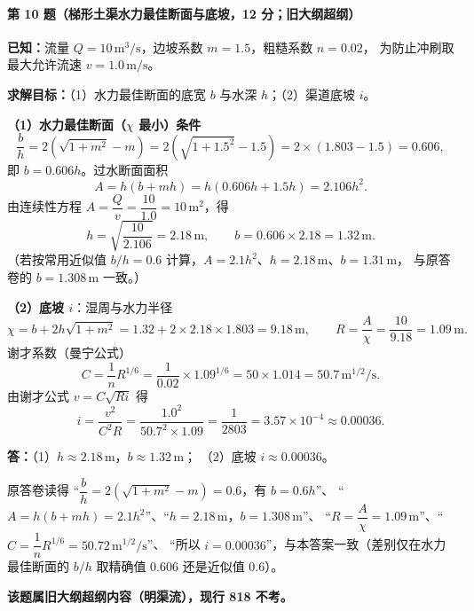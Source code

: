 \paragraph{第 10 题（梯形土渠水力最佳断面与底坡，12 分；旧大纲超纲）}
\begin{jie}
\textbf{已知：}流量 $Q=10\,\mathrm{m^{3}/s}$，边坡系数 $m=1.5$，粗糙系数 $n=0.02$，
为防止冲刷取最大允许流速 $v=1.0\,\mathrm{m/s}$。

\textbf{求解目标：}（1）水力最佳断面的底宽 $b$ 与水深 $h$；（2）渠道底坡 $i$。

\textbf{（1）水力最佳断面（$\chi$ 最小）条件}
\[
\frac{b}{h}=2\left(\sqrt{1+m^{2}}-m\right)
=2\left(\sqrt{1+1.5^{2}}-1.5\right)
=2\times(1.803-1.5)=0.606 ,
\]
即 $b=0.606h$。过水断面面积
\[
A=h(b+mh)=h(0.606h+1.5h)=2.106h^{2}.
\]
由连续性方程 $A=\dfrac{Q}{v}=\dfrac{10}{1.0}=10\,\mathrm{m^{2}}$，得
\[
h=\sqrt{\frac{10}{2.106}}=2.18\,\mathrm{m},
\qquad
b=0.606\times2.18=1.32\,\mathrm{m}.
\]
（若按常用近似值 $b/h=0.6$ 计算，$A=2.1h^{2}$、$h=2.18\,\mathrm{m}$、$b=1.31\,\mathrm{m}$，
与原答卷的 $b=1.308\,\mathrm{m}$ 一致。）

\textbf{（2）底坡 $i$}：湿周与水力半径
\[
\chi=b+2h\sqrt{1+m^{2}}=1.32+2\times2.18\times1.803=9.18\,\mathrm{m},
\qquad
R=\frac{A}{\chi}=\frac{10}{9.18}=1.09\,\mathrm{m}.
\]
谢才系数（曼宁公式）
\[
C=\frac{1}{n}R^{1/6}=\frac{1}{0.02}\times1.09^{1/6}=50\times1.014=50.7\,\mathrm{m^{1/2}/s}.
\]
由谢才公式 $v=C\sqrt{Ri}$ 得
\[
i=\frac{v^{2}}{C^{2}R}=\frac{1.0^{2}}{50.7^{2}\times1.09}
=\frac{1}{2803}=3.57\times10^{-4}\approx0.00036 .
\]

\textbf{答：}（1）$h\approx2.18\,\mathrm{m}$，$b\approx1.32\,\mathrm{m}$；
（2）底坡 $i\approx0.00036$。
\end{jie}

\begin{tishi}
原答卷读得 ``$\dfrac{b}{h}=2(\sqrt{1+m^{2}}-m)=0.6$，有 $b=0.6h$''、
``$A=h(b+mh)=2.1h^{2}$''、``$h=2.18\,\mathrm{m}$，$b=1.308\,\mathrm{m}$''、
``$R=\dfrac{A}{\chi}=1.09\,\mathrm{m}$''、``$C=\dfrac{1}{n}R^{1/6}=50.72\,\mathrm{m^{1/2}/s}$''、
``所以 $i=0.00036$''，与本答案一致（差别仅在水力最佳断面的 $b/h$ 取精确值 $0.606$ 还是近似值 $0.6$）。

\textbf{该题属旧大纲超纲内容（明渠流），现行 818 不考。}
\end{tishi}


